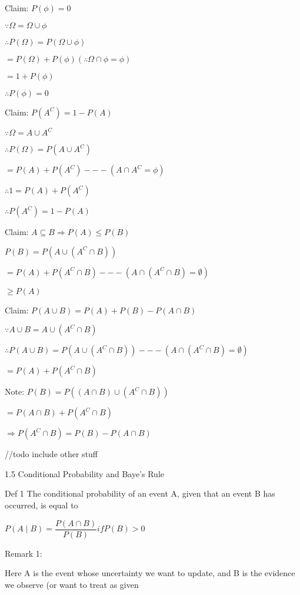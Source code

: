 \documentclass[12 pt]{article}
\begin{document}
			Claim: $P(\phi) = 0$
			
			$\because \Omega = \Omega \cup \phi$
			
			$\therefore P(\Omega) = P(\Omega \cup \phi)$
			
			$= P(\Omega) + P(\phi) (\therefore \Omega \cap \phi = \phi)$
			
			$= 1+ P(\phi)$
			
			$\therefore P(\phi) = 0$
			
			Claim: $P(A^C) = 1 - P(A)$
			
			$\because \Omega = A \cup A^C$
			
			$\therefore P(\Omega) = P(A \cup A^C)$
			
			$= P(A) + P(A^C) --- (A \cap A^C = \phi)$
			
			$\therefore 1 = P(A) + P(A^C)$
			
			$\therefore P(A^C) = 1 - P(A)$
			
			Claim: $A \subseteq B \Rightarrow P(A) \le P(B)$
			
			$P(B) = P(A \cup (A^C \cap B))$
			
			$= P(A) + P(A^C \cap B) --- (A \cap (A^C \cap B) = \emptyset)$
			
			$\ge P(A)$
			
			Claim: $P(A \cup B) = P(A) + P(B) - P(A \cap B)$
			
			$\because A \cup B = A \cup (A^C \cap B)$
			
			$\therefore P(A \cup B) = P(A \cup (A^C \cap B)) --- (A \cap (A^C \cap B) = \emptyset)$
			
			$= P(A) + P(A^C \cap B)$
			
			Note: $P(B) = P((A \cap B) \cup (A^C \cap B))$
			
			$= P(A \cap B) + P(A^C \cap B)$
			
			$\Rightarrow P(A^C \cap B) = P(B) - P(A \cap B)$
			
			//todo include other stuff
			
			1.5 Conditional Probability and Baye's Rule
			
			Def 1 The conditional probability of an event A, given that an event B has occurred, is equal to
			
			$P(A \mid B) = \dfrac{P(A \cap B)}{P(B)} if P(B) > 0$
			
			Remark 1:
			
			Here A is the event whose uncertainty we want to update, and B is the evidence we observe (or want to treat as given
			
\end{document}
